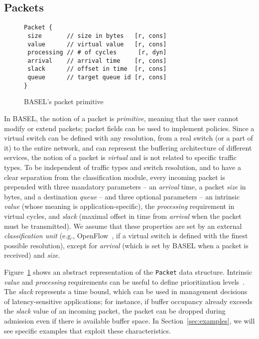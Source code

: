 \documentclass{article}
\newcommand{\barch}{BASEL}
\begin{document}
\subsection{Packets}
  
\begin{figure}[!t]
  \centering
  \begin{minipage}{0.8\linewidth}
\begin{lstlisting}[frame=tb,basicstyle=\ttfamily\small,belowskip=0em]
Packet {
 size       // size in bytes   [r, cons]
 value      // virtual value   [r, cons]
 processing // # of cycles      [r, dyn]
 arrival    // arrival time    [r, cons]
 slack      // offset in time  [r, cons]
 queue      // target queue id [r, cons]
}
\end{lstlisting}
    \caption{\barch{}'s packet primitive \label{list:buffer}}
  \end{minipage}
\end{figure}

In \barch{}, the notion of a packet is \emph{primitive}, meaning that the user cannot modify or extend packets; packet fields can be used to implement policies. Since a virtual switch can be defined with any resolution, from a real switch (or a part of it) to the entire network, and can represent the buffering architecture of different services, the notion of a packet is \emph{virtual} and is not related to specific traffic types. To be independent of traffic types and switch resolution, and to have a clear separation from the classification module, every incoming packet is prepended with three mandatory parameters -- an \emph{arrival} time, a packet \emph{size} in bytes, and a destination \emph{queue} -- and three optional parameters -- an intrinsic \emph{value} (whose
meaning is application-specific), the \emph{processing} requirement in virtual cycles, and \emph{slack} (maximal offset in time from \emph{arrival} when the packet must be transmitted). We assume that these properties  are set by an
external \emph{classification unit} (e.g., OpenFlow~\cite{OF}, if a virtual switch is defined with the finest possible resolution), except for \emph{arrival} (which is set by \barch{} when a packet is received) and \emph{size}.

Figure~\ref{list:buffer} shows an abstract representation of the \lstinline|Packet| data structure.
Intrinsic \emph{value} and \emph{processing} requirements can be useful to define prioritization
levels~\cite{KeslassyKSS12}. The \emph{slack} represents a time bound, which can be used in management decisions
of latency-sensitive applications; for instance, if buffer occupancy already exceeds the \emph{slack} value of an
incoming packet, the packet can be dropped during admission even if there is available buffer space. In Section~\ref{sec:examples}, we will see specific examples that exploit these characteristics.
\end{document}
